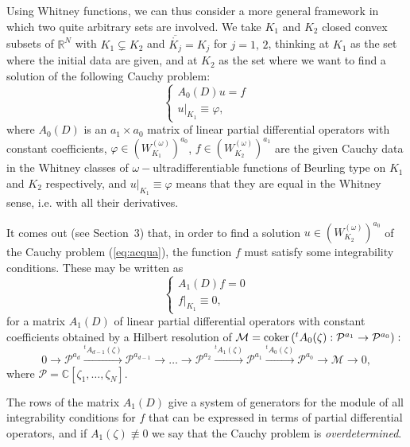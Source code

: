 \documentclass[twoside]{amsart}
\begin{document}
Using Whitney functions, we
can thus consider a more general framework
in which two quite arbitrary sets are involved. We take $K_{1}$ and
$K_{2}$ closed convex subsets of ${\mathbb R}^N$ with $K_{1}\subsetneq K_{2}$
and $\overline{\mathring{K_{j}}}=K_{j}$ for $j=1,\,2$, thinking
at $K_{1}$ as the set where the initial data are given, and at $K_{2}$
as the set where we want to find a solution of the following Cauchy
problem:
\begin{equation}
\begin{cases}
A_{0}(D)u=f\\
\left.u\right|_{K_{1}}\equiv\varphi,
\end{cases}\label{eq:acqua}
\end{equation}
where $A_{0}(D)$ is an $a_{1}\times a_{0}$ matrix of linear partial
differential operators with constant coefficients, 
$\varphi\in\left(W_{K_{1}}^{(\omega)}\right)^{a_{0}}$,
$f\in\left(W_{K_{2}}^{(\omega)}\right)^{a_{1}}$ are the given Cauchy
data in the Whitney classes of $\omega-$ultradifferentiable functions
of Beurling type on $K_{1}$ and $K_{2}$ respectively, and
$\left.u\right|_{K_{1}}\equiv\varphi$
means that they are equal in the Whitney sense, i.e. with all their
derivatives.

It comes out (see Section~3) that, in order to find a solution 
$u\in\left(W_{K_{2}}^{(\omega)}\right)^{a_{0}}$
of the Cauchy problem (\ref{eq:acqua}), the function $f$ must satisfy
some integrability conditions. These may be written as
\begin{equation}
\begin{cases}
A_{1}(D)f=0\\
\left.f\right|_{K_{1}}\equiv0,
\end{cases}\label{eq:fuoco}
\end{equation}
for a matrix $A_{1}(D)$ of linear partial differential operators
with constant coefficients obtained by a Hilbert resolution of 
${\mathcal{M}}={\rm coker}\left(^{t}A_{0}(\zeta):{\mathcal P}^{a_{1}}
\rightarrow{\mathcal P}^{a_{0}}\right):$
\[
0\longrightarrow{\mathcal P}^{a_{d}}
\xrightarrow{^{t}A_{d-1}(\zeta)}{\mathcal P}^{a_{d-1}}
\longrightarrow\ldots\longrightarrow{\mathcal P}^{a_{2}}
\xrightarrow{^{t}A_{1}(\zeta)}{\mathcal P}^{a_{1}}
\xrightarrow{^{t}A_{0}(\zeta)}{\mathcal P}^{a_{0}}
\longrightarrow{\mathcal M}\longrightarrow0,
\]
where ${\mathcal P}=\mathbb{C}[\zeta_{1},\ldots,\zeta_{N}]$.

The rows of the matrix $A_{1}(D)$ give a system of generators for
the module of all integrability conditions for $f$ that can be expressed
in terms of partial differential operators,
and if $A_1(\zeta)\not\equiv0$ we say that the Cauchy problem is 
{\em overdetermined}.
\end{document}
